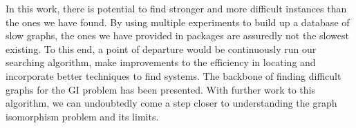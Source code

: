 In this work, there is potential to find stronger and more difficult instances than the ones we have found. By using multiple experiments to build up a database of slow graphs, the ones we have provided in packages are assuredly not the slowest existing. To this end, a point of departure would be continuously run our searching algorithm, make improvements to the efficiency in locating and incorporate better techniques to find systems. The backbone of finding difficult graphs for the GI problem has been presented. With further work to this algorithm, we can undoubtedly come a step closer to understanding the graph isomorphism problem and its limits.

